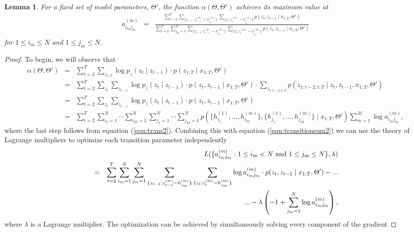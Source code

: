 \documentclass{amsart}
\newtheorem{lemma}[theorem]{Lemma}
\begin{document}
\begin{lemma}
For a fixed set of model parameters, $\Theta'$, the function $\alpha(\Theta,\Theta')$ achieves its maximum value at
\begin{eqnarray*}
a_{i_mj_m}^{(m)} &=& \frac{\sum_{t=2}^T\sum_{\{z_{t-1}:z_{t-1}^{(m)}=h_{i_m}^{(m)}\}}\sum_{\{z_t:z_t^{(m)}=h_{j_m}^{(m)}\}}p(z_{t},z_{t-1}\mid x_{1:T},\Theta')}{\sum_{t=2}^T\sum_{j_m=1}^N\sum_{\{z_{t-1}:z_{t-1}^{(m)}=h_{i_m}^{(m)}\}}\sum_{\{z_t:z_t^{(m)}=h_{j_m}^{(m)}\}}p(z_{t},z_{t-1}\mid x_{1:T},\Theta')}
\end{eqnarray*}
for $1\leq i_m\leq N$ and $1\leq j_m\leq N$.
\end{lemma}

\begin{proof}
To begin, we will observe that 
\begin{eqnarray*}
\alpha(\Theta,\Theta') &=& \sum_{t=2}^T\sum_{z_{1:T}}\log p_z(z_t\mid z_{t-1})\cdot p(z_{1:T}\mid x_{1:T},\Theta')\\
&=& \sum_{t=2}^T\sum_{z_{t}}\sum_{z_{t-1}}\log p_z(z_t\mid z_{t-1})\cdot p(z_t,z_{t-1}\mid x_{1:T},\Theta')\cdot \sum_{z_{1:t-2,t:T}}p(z_{1:t-2,t:T}\mid z_t,z_{t-1},x_{1:T},\Theta')\\
& = & \sum_{t=2}^T\sum_{z_{t}}\sum_{z_{t-1}}\log p_z(z_t\mid z_{t-1})\cdot p(z_t,z_{t-1}\mid x_{1:T},\Theta')\\
& = & \sum_{t=2}^T\sum_{i_1=1}^N\cdots\sum_{i_M=1}^N\sum_{j_1=1}^N\cdots\sum_{j_M=1}^Np(\{h_{i_1}^{(1)},...,h_{i_M}^{(m)}\},\{h_{j_1}^{(1)},...,h_{j_M}^{(m)}\}\mid x_{1:T},\Theta')\sum_{m=1}^M\log a_{i_mj_m}^{(m)},
\end{eqnarray*}
where the last step follows from equation (\ref{eqn:trans2}).  Combining this with equation (\ref{eqn:transitionsum2}) we can use the theory of Lagrange multipliers to optimize each transition parameter independently
\begin{eqnarray*}
&&L(\{a_{i_mj_m}^{(m)}:1\leq i_m<N\text{ and }1\leq j_m\leq N\},\lambda) \\
& = & \sum_{t=2}^T\sum_{i_m=1}^N\sum_{j_m=1}^N\sum_{\{z_{t-1}:z_{t-1}^{(m)}=h_{i_m}^{(m)}\}}\sum_{\{z_{t}:z_{t}^{(m)}=h_{j_m}^{(m)}\}}\log a_{i_mj_m}^{(m)}\cdot p(z_t,z_{t-1}\mid x_{1:T},\Theta') - ...\\
&&\hspace{10mm}...-\lambda \left(-1+\sum_{j_m=1}^N\log a_{i_mj_m}^{(m)}\right),
\end{eqnarray*}
where $\lambda$ is a Lagrange multiplier.  The optimization can be achieved by simultaneously solving every component of the gradient 

\end{proof}
\end{document}
